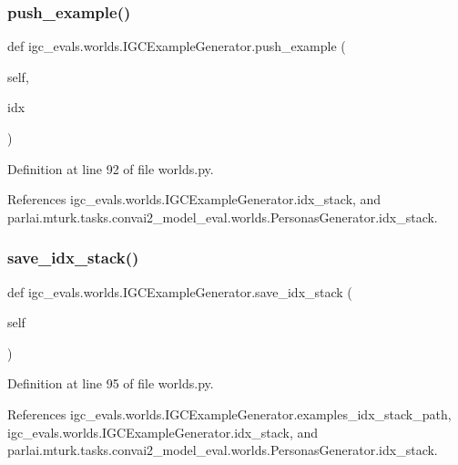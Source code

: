\subsubsection{\texorpdfstring{push\+\_\+example()}{push\_example()}}
{\footnotesize\ttfamily def igc\+\_\+evals.\+worlds.\+I\+G\+C\+Example\+Generator.\+push\+\_\+example (\begin{DoxyParamCaption}\item[{}]{self,  }\item[{}]{idx }\end{DoxyParamCaption})}



Definition at line 92 of file worlds.\+py.



References igc\+\_\+evals.\+worlds.\+I\+G\+C\+Example\+Generator.\+idx\+\_\+stack, and parlai.\+mturk.\+tasks.\+convai2\+\_\+model\+\_\+eval.\+worlds.\+Personas\+Generator.\+idx\+\_\+stack.

\mbox{\label{classigc__evals_1_1worlds_1_1IGCExampleGenerator_a3f787da040d9b83d9c857b8ef65d36eb}} 
\subsubsection{\texorpdfstring{save\+\_\+idx\+\_\+stack()}{save\_idx\_stack()}}
{\footnotesize\ttfamily def igc\+\_\+evals.\+worlds.\+I\+G\+C\+Example\+Generator.\+save\+\_\+idx\+\_\+stack (\begin{DoxyParamCaption}\item[{}]{self }\end{DoxyParamCaption})}



Definition at line 95 of file worlds.\+py.



References igc\+\_\+evals.\+worlds.\+I\+G\+C\+Example\+Generator.\+examples\+\_\+idx\+\_\+stack\+\_\+path, igc\+\_\+evals.\+worlds.\+I\+G\+C\+Example\+Generator.\+idx\+\_\+stack, and parlai.\+mturk.\+tasks.\+convai2\+\_\+model\+\_\+eval.\+worlds.\+Personas\+Generator.\+idx\+\_\+stack.



